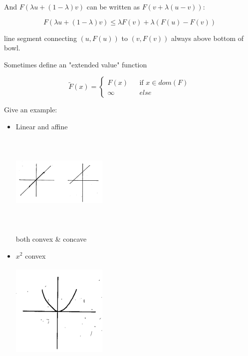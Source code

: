And $F(\lambda u + (1-\lambda)v)$ can be written as $F(v + \lambda(u-v))$:

\begin{equation*}
F(\lambda u + (1-\lambda)v) \leq \lambda F(v) + \lambda(F(u)-F(v))
\end{equation*}

line segment connecting $(u,F(u))$ to $(v, F(v))$ always above bottom of bowl.


Sometimes define an "extended value" function

$$ \tilde{F}(x)=\left\{
\begin{array}{rcl}
F(x)       &      & \text{if } x\in dom(F)\\
\infty   &      & else
\end{array} \right. 
$$

Give an example:
\begin{itemize}
	\item Linear and affine
	
	\begin{marginfigure}
	\centering
	\includegraphics[width=1.8in,height=1.8in]{figures/ch08/figure1030_7.png}
	\end{marginfigure}
	
	both convex \& concave
	
	\item $x^2$ convex
	
	\begin{marginfigure}
	\centering
	\includegraphics[width=1.8in,height=1.8in]{figures/ch08/figure1030_8.png}
	\end{marginfigure}
	

\end{itemize}
